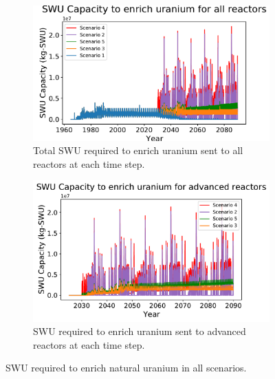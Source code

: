 \begin{figure}
    \centering
    \begin{subfigure}{0.45\textwidth}
        \centering
        \includegraphics[scale=0.4]{../figures/totalswu_scenarios_all.pdf}
        \caption{Total \gls{SWU} required to enrich uranium sent to all reactors at each time step.}
        \label{fig:totalswu_all}
    \end{subfigure}
    \hspace{1.8cm}
    \begin{subfigure}{0.45\textwidth}
        \centering
        \includegraphics[scale=0.4]{../figures/haleuSWU_scenarios_all.pdf}
        \caption{\gls{SWU} required to enrich uranium sent to advanced reactors at each time step.}
        \label{fig:haleuswu_al}
    \end{subfigure}
    \caption{\gls{SWU} required to enrich natural uranium in all scenarios.}
    \label{fig:swu_all}
\end{figure}

